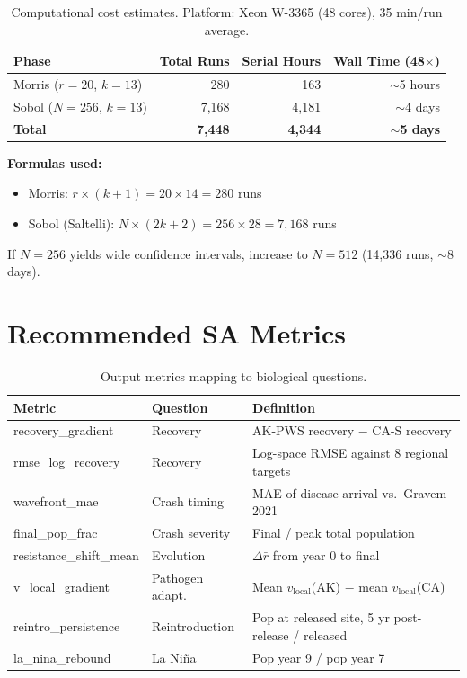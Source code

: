 \documentclass[11pt,a4paper]{article}
\begin{document}
\begin{table}[H]
\centering
\caption{Computational cost estimates. Platform: Xeon W-3365 (48 cores), 35 min/run average.}
\begin{tabular}{lrrr}
\toprule
\textbf{Phase} & \textbf{Total Runs} & \textbf{Serial Hours} & \textbf{Wall Time (48$\times$)} \\
\midrule
Morris ($r=20$, $k=13$) & 280 & 163 & $\sim$5 hours \\
Sobol ($N=256$, $k=13$) & 7{,}168 & 4{,}181 & $\sim$4 days \\
\midrule
\textbf{Total} & \textbf{7,448} & \textbf{4,344} & $\sim$\textbf{5 days} \\
\bottomrule
\end{tabular}
\end{table}

\noindent\textbf{Formulas used:}
\begin{itemize}
    \item Morris: $r \times (k + 1) = 20 \times 14 = 280$ runs
    \item Sobol (Saltelli): $N \times (2k + 2) = 256 \times 28 = 7{,}168$ runs
\end{itemize}

\noindent If $N = 256$ yields wide confidence intervals, increase to $N = 512$ (14,336 runs, $\sim$8 days).

\section{Recommended SA Metrics}

\begin{table}[H]
\centering
\caption{Output metrics mapping to biological questions.}
\begin{tabular}{llp{6cm}}
\toprule
\textbf{Metric} & \textbf{Question} & \textbf{Definition} \\
\midrule
recovery\_gradient & Recovery & AK-PWS recovery $-$ CA-S recovery \\
rmse\_log\_recovery & Recovery & Log-space RMSE against 8 regional targets \\
wavefront\_mae & Crash timing & MAE of disease arrival vs.\ Gravem 2021 \\
final\_pop\_frac & Crash severity & Final / peak total population \\
resistance\_shift\_mean & Evolution & $\Delta\bar{r}$ from year 0 to final \\
v\_local\_gradient & Pathogen adapt. & Mean $v_\mathrm{local}$(AK) $-$ mean $v_\mathrm{local}$(CA) \\
reintro\_persistence & Reintroduction & Pop at released site, 5 yr post-release / released \\
la\_nina\_rebound & La Ni\~na & Pop year 9 / pop year 7 \\
\bottomrule
\end{tabular}
\end{table}
\end{document}
